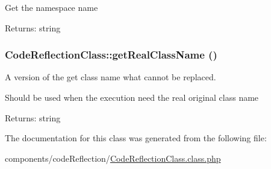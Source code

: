 Get the namespace name

\begin{Desc}
\item[Returns:]string \end{Desc}
\hypertarget{class_code_reflection_class_d4192b5d48919ca2cd5ef72db74a8ad5}{
\subsubsection[{getRealClassName}]{\setlength{\rightskip}{0pt plus 5cm}CodeReflectionClass::getRealClassName ()}}
\label{class_code_reflection_class_d4192b5d48919ca2cd5ef72db74a8ad5}


A version of the get class name what cannot be replaced.

Should be used when the execution need the real original class name

\begin{Desc}
\item[Returns:]string \end{Desc}


The documentation for this class was generated from the following file:\begin{CompactItemize}
\item 
components/codeReflection/\hyperlink{_code_reflection_class_8class_8php}{CodeReflectionClass.class.php}\end{CompactItemize}
